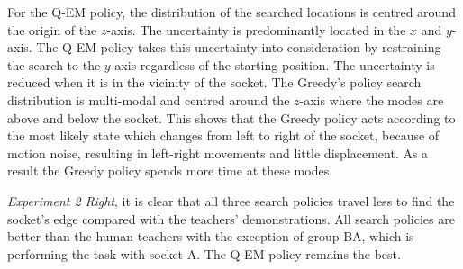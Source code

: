 \documentclass[final,5p,times,twocolumn]{elsarticle}
\begin{document}
For the  Q-EM policy, the distribution of the searched locations is centred around the origin of the $z$-axis.
The uncertainty is predominantly located in the $x$ and $y$-axis. The Q-EM policy takes this uncertainty 
into consideration by restraining the search to the $y$-axis regardless of the starting position. The uncertainty 
is reduced when it is in the vicinity of the socket. The Greedy's policy search distribution is multi-modal and 
centred around the $z$-axis where the modes are above and below the socket. This shows that the Greedy policy 
acts according to the most likely state which changes from left to right of the socket, because of motion noise, 
resulting in left-right movements and little displacement. As a result the Greedy policy spends more time at these modes.

\textit{Experiment 2 Right}, it is clear that all three search policies travel less to find the socket's edge compared 
with the teachers' demonstrations. All search policies are better than the human teachers with the exception of group BA, 
which is performing the task with socket A. The Q-EM policy remains the best. 
\end{document}
